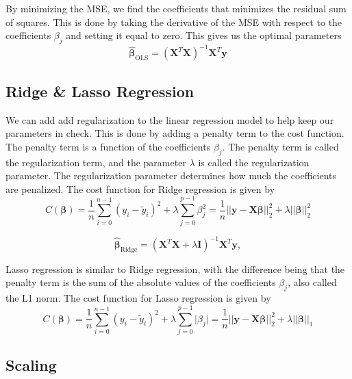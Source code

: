 \documentclass[twoside,11pt]{report}
\begin{document}
By minimizing the MSE, we find the coefficients that minimizes the residual sum of squares. This is done by taking the derivative of the
MSE with respect to the coefficients $\beta_j$ and setting it equal to zero. This gives us the optimal parameters
$$
\hat{\mathbf{\beta}}_{\mathrm{OLS}} = \left(\mathbf{X}^T\mathbf{X}\right)^{-1}\mathbf{X}^T\mathbf{y}
$$


\subsection{Ridge \& Lasso Regression}
\label{sec:ridge}

We can add add regularization to the linear regression model to help keep our parameters in check. 
This is done by adding a penalty term to the cost function. The penalty term is a function of the coefficients $\beta_j$. 
The penalty term is called the regularization term, and the parameter $\lambda$ is called the regularization parameter. 
The regularization parameter determines how much the coefficients are penalized. The cost function for Ridge regression is given by
$$
C(\mathbf{\beta}) = \frac{1}{n}\sum_{i=0}^{n-1}(y_i-\tilde{y}_i)^2 + \lambda\sum_{j=0}^{p-1}\beta_j^2  
=\frac{1}{n}\vert\vert \mathbf{y}-\mathbf{X}\mathbf{\beta}\vert\vert_2^2 + \lambda\vert\vert\mathbf{\beta}\vert\vert_2^2
$$




$$
\hat{\mathbf{\beta}}_{\mathrm{Ridge}} = \left(\mathbf{X}^T\mathbf{X}+\lambda\mathbf{I}\right)^{-1}\mathbf{X}^T\mathbf{y},
$$


Lasso regression is similar to Ridge regression, with the difference being that the penalty term is the sum of the absolute values of the coefficients $\beta_j$, also called 
the L1 norm. The cost function for Lasso regression is given by
$$
C(\mathbf{\beta}) = \frac{1}{n}\sum_{i=0}^{n-1}(y_i-\tilde{y}_i)^2 + \lambda\sum_{j=0}^{p-1}\vert\beta_j\vert
=\frac{1}{n}\vert\vert \mathbf{y}-\mathbf{X}\mathbf{\beta}\vert\vert_2^2 + \lambda\vert\vert\mathbf{\beta}\vert\vert_1
$$




\subsection{Scaling}
\label{sec:scaling}
\end{document}
